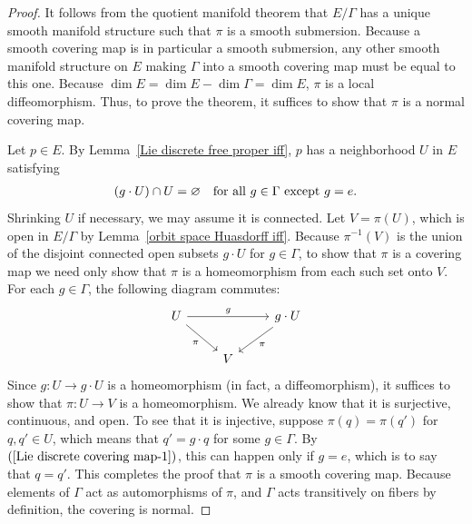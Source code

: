 \begin{proof}
It follows from the quotient manifold theorem that $E/\Gamma$ has a unique smooth manifold structure such that $\pi$ is a smooth submersion. Because a smooth covering map is in particular a smooth submersion, any other smooth manifold structure on $E$ making $\Gamma$ into a smooth covering map must be equal to this one. Because $\dim E=\dim E-\dim\Gamma=\dim E$, $\pi$ is a local diffeomorphism. Thus, to prove the theorem, it suffices to show that $\pi$ is a normal covering map.\par
Let $p\in E$. By Lemma~\ref{Lie discrete free proper iff}, $p$ has a neighborhood $U$ in $E$ satisfying
\begin{align}\label{Lie discrete covering map-1}
(g\cdot U)\cap U=\varnothing\quad\text{for all $g\in\Gamma$ except $g=e$}.
\end{align}
Shrinking $U$ if necessary, we may assume it is connected. Let $V=\pi(U)$, which
is open in $E/\Gamma$ by Lemma~\ref{orbit space Huasdorff iff}. Because $\pi^{-1}(V)$ is the union of the disjoint connected open subsets $g\cdot U$ for $g\in\Gamma$, to show that $\pi$ is a covering map we need only show that $\pi$ is a homeomorphism from each such set onto $V$. For each $g\in\Gamma$, the following diagram commutes:
\[\begin{tikzcd}
U\ar[rr,"g"]\ar[rd,swap,"\pi"]&&g\cdot U\ar[ld,"\pi"]\\
&V&
\end{tikzcd}\]
Since $g:U\to g\cdot U$ is a homeomorphism (in fact, a diffeomorphism), it suffices to show that $\pi:U\to V$ is a homeomorphism. We already know that it is surjective, continuous, and open. To see that it is injective, suppose $\pi(q)=\pi(q')$ for $q,q'\in U$, which means that $q'=g\cdot q$ for some $g\in\Gamma$. By $(\ref{Lie discrete covering map-1})$, this can happen only if $g=e$, which is to say that $q=q'$. This completes the proof that $\pi$ is a smooth covering map. Because elements of $\Gamma$ act as automorphisms of $\pi$, and $\Gamma$ acts transitively on fibers by definition, the covering is normal.
\end{proof}
